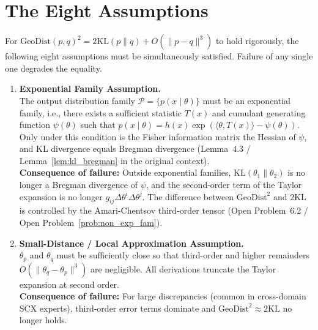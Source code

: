 \documentclass{article}
\newcommand{\GeoDist}{\mathrm{GeoDist}}
\newcommand{\KL}{\mathrm{KL}}
\begin{document}
\section{The Eight Assumptions}
\label{sec:assumptions}

For $\GeoDist(p,q)^2 = 2\KL(p\|q) + O(\|p-q\|^3)$ to hold rigorously,
the following eight assumptions must be simultaneously satisfied.
Failure of any single one degrades the equality.

\vspace{1em}

\begin{enumerate}[label=\textbf{H\arabic*:}, leftmargin=*, itemsep=0.8em]

    \item \textbf{Exponential Family Assumption.} \\
    The output distribution family $\mathcal{P} = \{p(x \mid \theta)\}$ must be an exponential family,
    i.e., there exists a sufficient statistic $T(x)$ and cumulant generating function $\psi(\theta)$ such that
    $p(x \mid \theta) = h(x) \exp(\langle\theta, T(x)\rangle - \psi(\theta))$.
    Only under this condition is the Fisher information matrix the Hessian of $\psi$,
    and KL divergence equals Bregman divergence (Lemma~4.3 / Lemma~\ref{lem:kl_bregman} in the original context).
    \\[0.3em]
    \textbf{Consequence of failure:} Outside exponential families, $\KL(\theta_1\|\theta_2)$ is no longer a Bregman divergence of $\psi$,
    and the second-order term of the Taylor expansion is no longer $g_{ij}\Delta\theta^i\Delta\theta^j$.
    The difference between $\GeoDist^2$ and $2\KL$ is controlled by the Amari-Chentsov third-order tensor (Open Problem~6.2 / Open Problem~\ref{prob:non_exp_fam}).

    \item \textbf{Small-Distance / Local Approximation Assumption.} \\
    $\theta_p$ and $\theta_q$ must be sufficiently close so that third-order
    and higher remainders $O(\|\theta_q - \theta_p\|^3)$ are negligible. All derivations
    truncate the Taylor expansion at second order.
    \\[0.3em]
    \textbf{Consequence of failure:} For large discrepancies (common in cross-domain SCX experts),
    third-order error terms dominate and $\GeoDist^2 \approx 2\KL$ no longer holds.


\end{enumerate}
\end{document}
